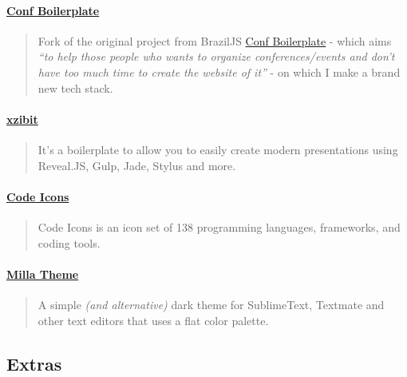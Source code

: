 \documentclass[]{article}
\let\oldparagraph\paragraph
\renewcommand{\paragraph}[1]{\oldparagraph{#1}\mbox{}}
\begin{document}
\paragraph{\texorpdfstring{\href{https://github.com/mabrasil/conf-boilerplate}{Conf
Boilerplate}}{Conf Boilerplate}}\label{conf-boilerplate}

\begin{quote}
Fork of the original project from BrazilJS
\href{https://github.com/braziljs/conf-boilerplate}{Conf Boilerplate} -
which aims \emph{``to help those people who wants to organize
conferences/events and don't have too much time to create the website of
it''} - on which I make a brand new tech stack.
\end{quote}

\paragraph{\texorpdfstring{\href{https://github.com/mabrasil/xzibit}{xzibit}}{xzibit}}\label{xzibit}

\begin{quote}
It's a boilerplate to allow you to easily create modern presentations
using Reveal.JS, Gulp, Jade, Stylus and more.
\end{quote}

\paragraph{\texorpdfstring{\href{https://github.com/mabrasil/codeicons}{Code
Icons}}{Code Icons}}\label{code-icons}

\begin{quote}
Code Icons is an icon set of 138 programming languages, frameworks, and
coding tools.
\end{quote}

\paragraph{\texorpdfstring{\href{https://github.com/mabrasil/milla-theme}{Milla
Theme}}{Milla Theme}}\label{milla-theme}

\begin{quote}
A simple \emph{(and alternative)} dark theme for SublimeText, Textmate
and other text editors that uses a flat color palette.
\end{quote}

\subsection{Extras}\label{extras}
\end{document}
